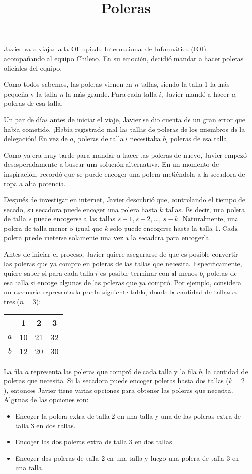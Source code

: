\documentclass{oci}
\title{Poleras}
\begin{document}
\begin{problemDescription}
Javier va a viajar a la Olimpiada Internacional de Informática (IOI)
acompañando al equipo Chileno.
En su emoción, decidió mandar a hacer poleras oficiales del equipo.

Como todos sabemos, las poleras vienen en $n$ tallas, siendo la talla 1 la más pequeña
y la talla $n$ la más grande.
Para cada talla $i$, Javier mandó a hacer $a_i$ poleras de esa talla.

Un par de días antes de iniciar el viaje, Javier se dio
cuenta de un gran error que había cometido.
¡Había registrado mal las tallas de poleras de los miembros de la delegación!
En vez de $a_i$ poleras de talla $i$ necesitaba $b_i$ poleras de esa talla.

Como ya era muy tarde para mandar a hacer las poleras de nuevo, Javier
empezó desesperadamente a buscar una solución alternativa.
En un momento de inspiración, recordó que se puede encoger una polera metiéndola a
la secadora de ropa a alta potencia.

Después de investigar en internet, Javier descubrió que, controlando el tiempo de secado, su
secadora puede encoger una polera hasta $k$ tallas.
Es decir, una polera de talla $s$ puede encogerse a las tallas $s-1, s-2, \dots$, $s-k$.
Naturalmente, una polera de talla menor o igual que $k$ solo puede encogerse hasta la talla 1.
Cada polera puede meterse solamente una vez a la secadora para encogerla.

Antes de iniciar el proceso, Javier quiere asegurarse de que es
posible convertir las poleras que ya compró en poleras de
las tallas que necesita.
Específicamente, quiere saber si para cada talla $i$ es posible terminar
con al menos $b_i$ poleras de esa talla si encoge algunas de las poleras que ya compró.
Por ejemplo, considera un escenario representado por la siguiente tabla, donde la cantidad
de tallas es tres ($n=3$):
\begin{center}
\begin{tabular}{cccc}
   & \footnotesize 1 & \footnotesize2  &  \footnotesize 3 \\
\hline
 $a$ & 10 & 21 & 32 \\
 $b$ & 12 & 20 & 30 \\
\hline
\end{tabular}
\end{center}
La fila $a$ representa las poleras que compró de cada talla y la fila $b$,
la cantidad de poleras que necesita. Si la secadora puede encoger poleras
hasta dos tallas ($k=2$), entonces Javier tiene varias opciones para obtener las poleras
que necesita. Algunas de las opciones son:
\begin{itemize}
    \item Encoger la polera extra de talla 2 en una talla y una de las poleras extra de talla
        3 en dos tallas.
    \item Encoger las dos poleras extra de talla 3 en dos tallas.
    \item Encoger dos poleras de talla 2 en una talla y luego una polera de talla 3 en una talla.
\end{itemize}


\end{problemDescription}
\end{document}
